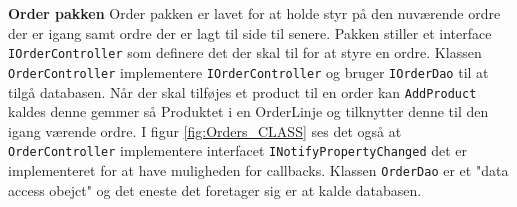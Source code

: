 \textbf{Order pakken}\newline
Order pakken er lavet for at holde styr på den nuværende ordre der er igang samt ordre der er lagt til side til senere.
Pakken stiller et interface \texttt{IOrderController} som definere det der skal til for at styre en ordre. 
Klassen \texttt{OrderController} implementere \texttt{IOrderController} og bruger \texttt{IOrderDao} til at tilgå databasen.
Når der skal tilføjes et product til en order kan \texttt{AddProduct} kaldes denne gemmer så Produktet i en OrderLinje og tilknytter denne til den igang værende ordre.
I figur \ref{fig:Orders_CLASS} ses det også at \texttt{OrderController} implementere interfacet \texttt{INotifyPropertyChanged} det er implementeret for at have muligheden for callbacks.
Klassen \texttt{OrderDao} er et "data access obejct" og det eneste det foretager sig er at kalde databasen. 

